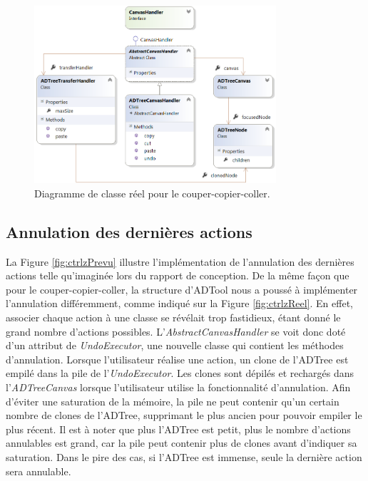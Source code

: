         \begin{figure}
            \centering
                \includegraphics[width=0.8\textwidth]{figure/copiercollerReel.png}
            \caption{Diagramme de classe réel pour le couper-copier-coller.}
            \label{fig:copypasteReel}
        \end{figure}
       
	\subsection{Annulation des dernières actions}
		 La {\sc Figure} \ref{fig:ctrlzPrevu} illustre l'implémentation de l'annulation des dernières actions telle qu'imaginée lors du rapport de conception. De la même façon que pour le couper-copier-coller, la structure d'ADTool nous a poussé à implémenter l'annulation différemment, comme indiqué sur la {\sc Figure} \ref{fig:ctrlzReel}. En effet, associer chaque action à une classe se révélait trop fastidieux, étant donné le grand nombre d'actions possibles. L'\emph{AbstractCanvasHandler} se voit donc doté d'un attribut de \emph{UndoExecutor}, une nouvelle classe qui contient les méthodes d'annulation. Lorsque l'utilisateur réalise une action, un clone de l'ADTree est empilé dans la pile de l'\emph{UndoExecutor}. Les clones sont dépilés et rechargés dans l'\emph{ADTreeCanvas} lorsque l'utilisateur utilise la fonctionnalité d'annulation. Afin d'éviter une saturation de la mémoire, la pile ne peut contenir qu'un certain nombre de clones de l'ADTree, supprimant le plus ancien pour pouvoir empiler le plus récent. Il est à noter que plus l'ADTree est petit, plus le nombre d'actions annulables est grand, car la pile peut contenir plus de clones avant d'indiquer sa saturation. Dans le pire des cas, si l'ADTree est immense, seule la dernière action sera annulable. 
		 
